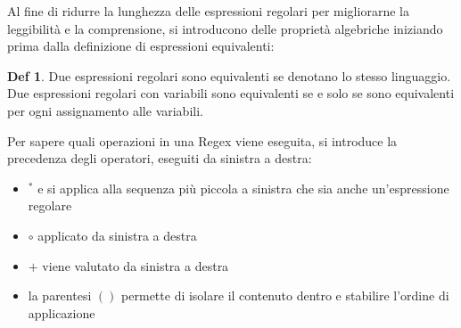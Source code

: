 \documentclass[a4paper]{book}
\theoremstyle{definition}%
\newtheorem*{defi}{Def}%
\begin{document}
Al fine di ridurre la lunghezza delle espressioni regolari per migliorarne la leggibilità e la comprensione, si introducono
delle proprietà algebriche iniziando prima dalla definizione di espressioni equivalenti:
\begin{defi}
  Due espressioni regolari sono equivalenti se denotano lo stesso linguaggio.
  Due espressioni regolari con variabili sono equivalenti se e solo se sono equivalenti per ogni assignamento alle variabili.
\end{defi}
Per sapere quali operazioni in una Regex viene eseguita, si introduce la precedenza degli operatori, eseguiti da sinistra a destra:
\begin{itemize}
  \item $^*$ e si applica alla sequenza più piccola a sinistra che sia anche un'espressione regolare
  \item $\circ$  applicato da sinistra a destra
  \item $+$  viene valutato da sinistra a destra
  \item la parentesi $( )$ permette di isolare il contenuto dentro e stabilire l'ordine di applicazione
\end{itemize}
\end{document}
